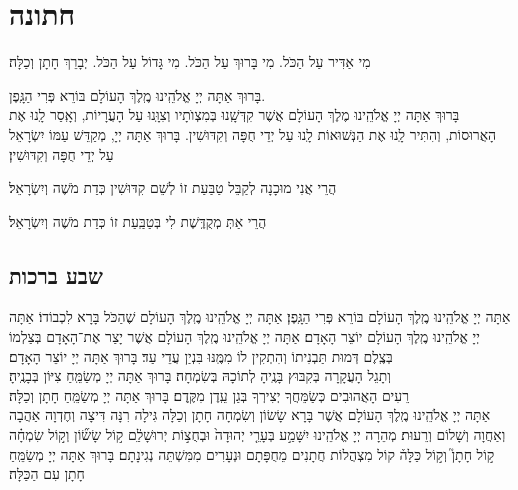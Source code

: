 \documentclass[twoside, openany, parskip=half, 11pt]{book}
\begin{document}
\chapter[חתונה]{ חתונה }

מִי אַדִּיר עַל הַכֹּל. מִי בָּרוּךְ עַל הַכֹּל. מִי גָּדוֹל עַל הַכֹּל. יְבָרֵךְ חָתָן וְכַלָּה׃

בָּרוּךְ אַתָּה יְיָ אֱלֹהֵֽינוּ מֶֽלֶךְ הָעוֹלָם בּוֹרֵא פְּרִי הַגָּֽפֶן.\\
בָּרוּךְ אַתָּה יְיָ אֱלֹהֵֽינוּ מֶלֶךְ הָעוֹלָם אֲשֶׁר קִדְּשָֽׁנוּ בְּמִצְוֺתָיו וְצִוָּֽנוּ עַל הָעֲרָיוֹת, וְאָֽסַר לָֽנוּ אֶת הָאֲרוּסוֹת, וְהִתִּיר לָֽנוּ אֶת הַנְּשׁוּאוֹת לָֽנוּ עַל יְדֵי חֻפָּה וְקִדּוּשִׁין. בָּרוּךְ אַתָּה יְיָ, מְקַדֵּשׁ עַמּוֹ יִשְׂרָאֵל עַל יְדֵי חֻפָּה וְקִדּוּשִׁין׃

הֲרֵי אֲנִי מוּכָנָה לְקַבֵּל טַבַּעַת זוֹ לְשֵׁם קִדּוּשִׁין כְּדַת מֹשֶׁה וְיִשְׂרָאֵל׃

הֲרֵי אַתְּ מְקֻדֶּֽשֶׁת לִי בְּטַבַּֽעַת זוֹ כְּדַת מֹשֶׁה וְיִשְׂרָאֵל׃


\section[שבע ברכות]{ שבע ברכות }


אַתָּה יְיָ אֱלֹהֵֽינוּ מֶֽלֶךְ הָעוֹלָם בּוֹרֵא פְּרִי הַגָּֽפֶן׃\hfill \break
{}
אַתָּה יְיָ אֱלֹהֵֽינוּ מֶֽלֶךְ הָעוֹלָם שֶׁהַכֹּל בָּרָא לִכְבוֹדוֹ׃\hfill \break
{}
אַתָּה יְיָ אֱלֹהֵֽינוּ מֶֽלֶךְ הָעוֹלָם יוֹצֵר הָאָדָם׃\hfill \break
{}
אַתָּה יְיָ אֱלֹהֵֽינוּ מֶֽלֶךְ הָעוֹלָם אֲשֶׁר יָצַר אֶת־הָאָדָם בְּצַלְמוֹ
בְּצֶֽלֶם דְּמוּת תַּבְנִיתוֹ וְהִתְקִין לוֹ מִמֶּֽנּוּ בִּנְיַן עֲדֵי עַד׃ בָּרוּךְ אַתָּה יְיָ יוֹצֵר הָאָדָם׃\\
וְתָגֵל הָעֲקָרָה בְּקִבּוּץ בָּנֶֽיהָ לְתוֹכָהּ בְּשִׂמְחָה׃
בָּרוּךְ אַתָּה יְיָ מְשַׂמֵּֽחַ צִיּוֹן בְּבָנֶֽיהָ׃\\
רֵעִים הָאֲהוּבִים כְּשַׂמֵּחֲךָ יְצִירְךָ בְּגַן עֵֽדֶן מִקֶּֽדֶם׃
בָּרוּךְ אַתָּה יְיָ מְשַׂמֵּֽחַ חָתָן וְכַלָּה׃\\
אַתָּה יְיָ אֱלֹהֵֽינוּ מֶֽלֶךְ הָעוֹלָם
אֲשֶׁר בָּרָא שָׂשׂוֹן וְשִׂמְחָה חָתָן וְכַלָּה גִּילָה רִנָּה דִּיצָה וְחֶדְוָה
אַהֲבָה וְאַחֲוָה וְשָׁלוֹם וְרֵעוּת׃
מְהֵרָה יְיָ אֱלֹהֵֽינוּ יִשָּׁמַ֣ע
בְּעָרֵ֤י יְהוּדָה֙ וּבְחֻצ֣וֹת יְרוּשָׁלַ֔‍ִם
ק֣וֹל שָׂשׂ֞וֹן וְק֣וֹל שִׂמְחָ֗ה ק֣וֹל חָתָן֮ וְק֣וֹל כַּלָּה֒
קוֹל מִצְהֲלוֹת חֲתָנִים מֵחֻפָּתָם וּנְעָרִים מִמִּשְׁתֵּה נְגִינָתָם׃
בָּרוּךְ אַתָּה יְיָ מְשַׂמֵּֽחַ חָתָן עִם הַכַּלָּה׃
\end{document}
